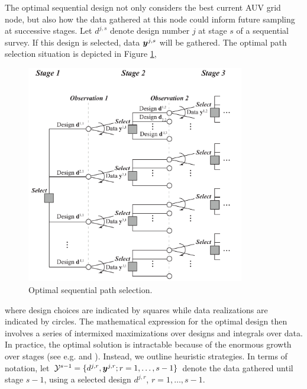\documentclass[aoas]{imsart}
\begin{document}
The optimal sequential design not only considers the best current AUV
grid node, but also how the data gathered at this node could inform future sampling at successive stages. Let $d^{j,s}$ denote design
number $j$ at stage $s$ of a sequential survey. If this design is
selected, data ${\boldsymbol y}^{j,s}$ will be gathered. The optimal path
selection situation is  depicted in Figure \ref{fig:PathSelOpt},
\begin{figure}[h!]
\centering
\includegraphics[width=0.85\textwidth]{Figures/sequent_select.pdf}
\caption{Optimal sequential path selection.}\label{fig:PathSelOpt}
\end{figure}
where design choices are indicated by squares while data realizations are indicated by circles. 
The mathematical expression for the optimal design then involves a
series of intermixed maximizations over designs and integrals over
data.  In practice, the optimal solution is intractable because of
the enormous growth over stages (see
e.g. \cite{sucar2015probabilistic} and \cite{powell2016perspectives}).
Instead, we outline heuristic strategies. In terms of notation, let
$\mathcal{Y}^{s-1} =\{d^{j,r}, {\boldsymbol y}^{j,r} ; r=1,\ldots,s-1 \}$ denote
the data gathered until stage $s-1$, using a selected design
$d^{j,r}$, $r=1,\ldots,s-1$.
\end{document}
